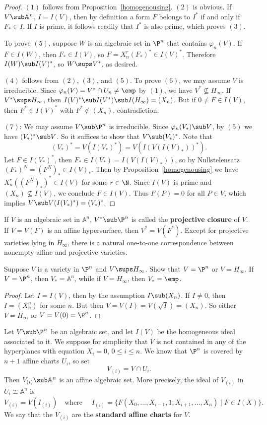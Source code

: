 \begin{proof}
$(1)$ follows from Proposition~\ref{homogenousing}. $(2)$ is obvious. If $V\sub\mathbb{A}^n$, $I=I(V)$, then by definition a form $F$ belongs to $I^*$ if and only if $F_*\in I$. If $I$ is prime, it follows readily that $I^*$ is also prime, which proves $(3)$.\par
To prove $(5)$, suppose $W$ is an algebraic set in $\P^n$ that contains $\varphi_n(V)$. If $F\in I(W)$, then $F_*\in I(V)$, so $F=X_n^r(F_*)^*\in I(V)^*$. Therefore $I(W)\sub I(V)^*$, so $W\sups V^*$, as desired.\par
$(4)$ follows from $(2)$, $(3)$, and $(5)$. To prove $(6)$, we may assume $V$ is irreducible. Since $\varphi_n(V)=V^*\cap U_n\neq\emp$ by $(1)$, we have $V^*\nsubseteq H_\infty$. If $V^*\sups H_\infty$, then $I(V)^*\sub I(V^*)\sub I(H_\infty)=(X_n)$. But if $0\neq F\in I(V)$, then $F^*\in I(V)^*$ with $F^*\notin (X_n)$, contradiction.\par
$(7)$: We may assume $V\sub\P^n$ is irreducible. Since $\varphi_n(V_*)\sub V$, by $(5)$ we have $(V_*)^*\sub V$. So it suffices to show that $V\sub (V_*)^*$. Note that
\[(V_*)^*=V(I(V_*)^*)=V(I(V(I(V)_*))^*).\]
Let $F\in I(V_*)^*$, then $F_*\in I(V_*)=I(V(I(V)_*))$, so by Nullstelensatz $(F_*)^N=(F^N)_*\in I(V)_*$. Then by Proposition~\ref{homogenousing} we have $X_n^r((F^N)_*)^*\in I(V)$ for some $r\in\N$. Since $I(V)$ is prime and $(X_n)\nsubseteq I(V)$, we conclude $F\in I(V)$. Thus $F(P)=0$ for all $P\in V$, which implies $V\sub V(I(V_*)^*)=(V_*)^*$.
\end{proof}
If $V$ is an algebraic set in $\mathbb{A}^n$, $V^*\sub\P^n$ is called the \textbf{projective closure} of $V$. If $V=V(F)$ is an affine hypersurface, then $V^*=V(F^*)$. Except for projective varieties lying in $H_\infty$, there is a natural one-to-one correspondence between nonempty affine and projective varieties.
\begin{proposition}
Suppose $V$ is a variety in $\P^n$ and $V\sups H_\infty$. Show that $V=\P^n$ or $V=H_\infty$. If $V=\P^n$, then $V_*=\mathbb{A}^n$, while if $V=H_\infty$, then $V_*=\emp$.
\end{proposition}
\begin{proof}
Let $I=I(V)$, then by the assumption $I\sub (X_n)$. If $I\neq 0$, then $I=(X_n^n)$ for some $n$. But then $V=V(I)=V(\sqrt{I})=(X_n)$. So either $V=H_\infty$ or $V=V(0)=\P^n$.
\end{proof}
Let $V\sub\P^n$ be an algebraic set, and let $I(V)$ be the homogeneous ideal associated to it. We suppose for simplicity that $V$ is not contained in any of the hyperplanes with equation $X_i=0$, $0\leq i\leq n$. We know that $\P^n$ is covered by $n+1$ affine charts $U_i$, so set
\[V_{(i)}=V\cap U_i.\]
Then $V_{(i)}\sub\mathbb{A}^n$ is an affine algebraic set. More precisely, the ideal of $V_{(i)}$ in $U_{i}\cong\mathbb{A}^n$ is
\[V_{(i)}=V(I_{(i)})\quad\text{where }\quad I_{(i)}=\{F(X_0,\dots,X_{i-1},1,X_{i+1},\dots,X_n)\mid F\in I(X)\}.\]
We say that the $V_{(i)}$ are the \textbf{standard affine charts} for $V$.

